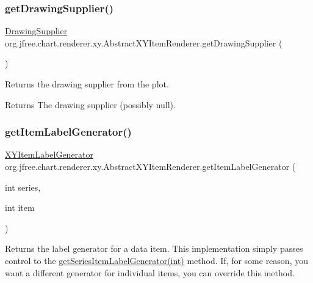 \subsubsection{\texorpdfstring{get\+Drawing\+Supplier()}{getDrawingSupplier()}}
{\footnotesize\ttfamily \mbox{\hyperlink{interfaceorg_1_1jfree_1_1chart_1_1plot_1_1_drawing_supplier}{Drawing\+Supplier}} org.\+jfree.\+chart.\+renderer.\+xy.\+Abstract\+X\+Y\+Item\+Renderer.\+get\+Drawing\+Supplier (\begin{DoxyParamCaption}{ }\end{DoxyParamCaption})}

Returns the drawing supplier from the plot.

\begin{DoxyReturn}{Returns}
The drawing supplier (possibly {\ttfamily null}). 
\end{DoxyReturn}
\mbox{\label{classorg_1_1jfree_1_1chart_1_1renderer_1_1xy_1_1_abstract_x_y_item_renderer_ab27f431c89d3468100e51b8091d4e570}} 
\subsubsection{\texorpdfstring{get\+Item\+Label\+Generator()}{getItemLabelGenerator()}\hspace{0.1cm}{\footnotesize\ttfamily [1/2]}}
{\footnotesize\ttfamily \mbox{\hyperlink{interfaceorg_1_1jfree_1_1chart_1_1labels_1_1_x_y_item_label_generator}{X\+Y\+Item\+Label\+Generator}} org.\+jfree.\+chart.\+renderer.\+xy.\+Abstract\+X\+Y\+Item\+Renderer.\+get\+Item\+Label\+Generator (\begin{DoxyParamCaption}\item[{int}]{series,  }\item[{int}]{item }\end{DoxyParamCaption})}

Returns the label generator for a data item. This implementation simply passes control to the \mbox{\hyperlink{classorg_1_1jfree_1_1chart_1_1renderer_1_1xy_1_1_abstract_x_y_item_renderer_a84c79d82b5bc9b856836ca5166a71b41}{get\+Series\+Item\+Label\+Generator(int)}} method. If, for some reason, you want a different generator for individual items, you can override this method.


